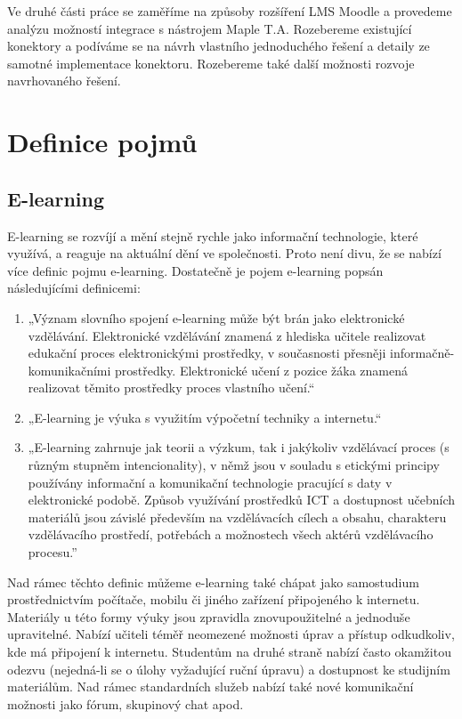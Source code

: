 \documentclass[
print,
  11pt,
  table,   
  nolof,    
  nolot,
  oneside,
  draft
]{fithesis3}
\begin{document}
Ve druhé části práce se zaměříme na způsoby rozšíření LMS Moodle a provedeme analýzu možností integrace s nástrojem Maple T.A. Rozebereme existující konektory a podíváme se na návrh vlastního jednoduchého řešení a detaily ze samotné implementace konektoru. Rozebereme také další možnosti rozvoje navrhovaného řešení.


\chapter{Definice pojmů}
	\section{E-learning}
E-learning se rozvíjí a mění stejně rychle jako informační technologie, které využívá, a reaguje na aktuální dění ve společnosti. Proto není divu, že se nabízí více definic pojmu e-learning. Dostatečně je pojem e-learning popsán následujícími definicemi:

\begin{enumerate}
  \item „Význam slovního spojení e-learning může být brán jako elektronické vzdělávání. Elektronické vzdělávání znamená z hlediska učitele realizovat edukační proces elektronickými prostředky, v současnosti přesněji informačně-komunikačními prostředky. Elektronické učení z pozice žáka znamená realizovat těmito prostředky proces vlastního učení.“ \cite{ockajova}
  \item „E-learning je výuka s využitím výpočetní techniky a internetu.“ \cite{korviny}
  \item „E-learning zahrnuje jak teorii a výzkum, tak i jakýkoliv vzdělávací proces (s různým stupněm intencionality), v němž jsou v souladu s etickými principy používány informační a komunikační technologie pracující s daty v elektronické podobě. Způsob využívání prostředků ICT a dostupnost učebních materiálů jsou závislé především na vzdělávacích cílech a obsahu, charakteru vzdělávacího prostředí, potřebách a možnostech všech aktérů vzdělávacího procesu.” \cite{zounek}

\end{enumerate}


Nad rámec těchto definic můžeme e-learning také chápat jako samostudium prostřednictvím počítače, mobilu či jiného zařízení připojeného k internetu. Materiály u této formy výuky jsou zpravidla znovupoužitelné a jednoduše upravitelné. Nabízí učiteli téměř neomezené možnosti úprav a přístup odkudkoliv, kde má připojení k internetu. Studentům na druhé straně nabízí často okamžitou odezvu (nejedná-li se o úlohy vyžadující ruční úpravu) a dostupnost ke studijním materiálům. Nad rámec standardních služeb nabízí také nové komunikační možnosti jako fórum, skupinový chat apod.
\end{document}
